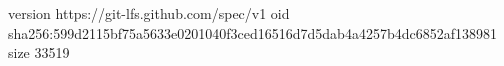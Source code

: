 version https://git-lfs.github.com/spec/v1
oid sha256:599d2115bf75a5633e0201040f3ced16516d7d5dab4a4257b4dc6852af138981
size 33519
